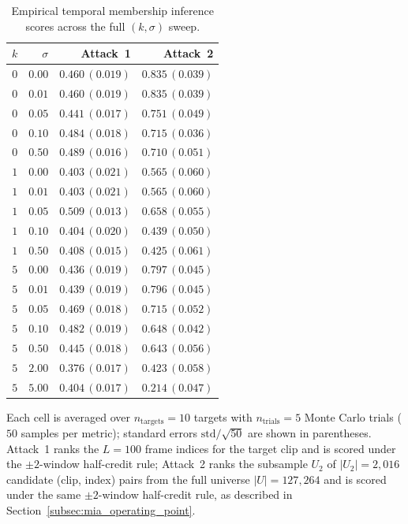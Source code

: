 \documentclass[sigconf,anonymous, review]{acmart}
\begin{document}
\begin{table}[!htbp]
\centering\small
\caption{Empirical temporal membership inference scores across the full $(k, \sigma)$ sweep.}
\label{tab:sigma_sweep}
\begin{tabular}{rrrr}
\toprule
$k$ & $\sigma$ & Attack~1 & Attack~2 \\
\midrule
$0$ & $0.00$ & $0.460\,(0.019)$  & $0.835\,(0.039)$ \\
$0$ & $0.01$ & $0.460\,(0.019)$ & $0.835\,(0.039)$ \\
$0$ & $0.05$ & $0.441\,(0.017)$ & $0.751\,(0.049)$ \\
$0$ & $0.10$ & $0.484\,(0.018)$ & $0.715\,(0.036)$ \\
$0$ & $0.50$ & $0.489\,(0.016)$ & $0.710\,(0.051)$ \\
\midrule
$1$ & $0.00$ & $0.403\,(0.021)$ & $0.565\,(0.060)$ \\
$1$ & $0.01$ & $0.403\,(0.021)$  & $0.565\,(0.060)$ \\
$1$ & $0.05$ & $0.509\,(0.013)$ & $0.658\,(0.055)$ \\
$1$ & $0.10$ & $0.404\,(0.020)$ & $0.439\,(0.050)$ \\
$1$ & $0.50$ & $0.408\,(0.015)$ & $0.425\,(0.061)$ \\
\midrule
$5$ & $0.00$ & $0.436\,(0.019)$ & $0.797\,(0.045)$ \\
$5$ & $0.01$ & $0.439\,(0.019)$ & $0.796\,(0.045)$ \\
$5$ & $0.05$ & $0.469\,(0.018)$ & $0.715\,(0.052)$ \\
$5$ & $0.10$ & $0.482\,(0.019)$ & $0.648\,(0.042)$ \\
$5$ & $0.50$ & $0.445\,(0.018)$ & $0.643\,(0.056)$ \\
$5$ & $2.00$ & $0.376\,(0.017)$ & $0.423\,(0.058)$ \\
$5$ & $5.00$ & $0.404\,(0.017)$  & $0.214\,(0.047)$ \\
\bottomrule
\end{tabular}
\end{table}

Each cell is averaged over $n_{\mathrm{targets}} = 10$ targets with $n_{\mathrm{trials}} = 5$ Monte Carlo trials ($50$ samples per metric); standard errors $\mathrm{std}/\sqrt{50}$ are shown in parentheses. Attack~1 ranks the $L = 100$ frame indices for the target clip and is scored under the $\pm 2$-window half-credit rule; Attack~2 ranks the subsample $U_2$ of $|U_2| = 2{,}016$ candidate (clip, index) pairs from the full universe $|U| = 127{,}264$ and is scored under the same $\pm 2$-window half-credit rule, as described in Section~\ref{subsec:mia_operating_point}.
\end{document}
